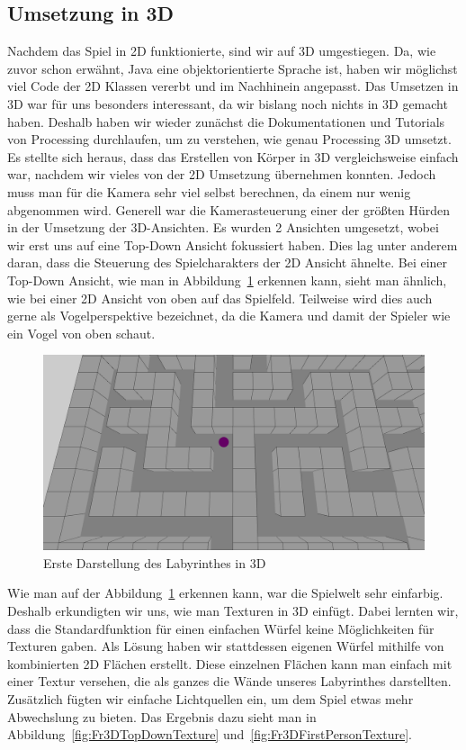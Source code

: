 \subsection{Umsetzung in 3D}\label{subsec:umsetzung-in-3D}
Nachdem das Spiel in 2D funktionierte, sind wir auf 3D umgestiegen. Da, wie zuvor schon erwähnt, Java eine objektorientierte Sprache ist, haben wir möglichst viel Code der 2D Klassen vererbt und im Nachhinein angepasst.
Das Umsetzen in 3D war für uns besonders interessant, da wir bislang noch nichts in 3D gemacht haben. Deshalb haben wir wieder zunächst die Dokumentationen und Tutorials von Processing durchlaufen, um zu verstehen, wie genau Processing 3D umsetzt. Es stellte sich heraus, dass das Erstellen von Körper in 3D vergleichsweise einfach war, nachdem wir vieles von der 2D Umsetzung übernehmen konnten. Jedoch muss man für die Kamera sehr viel selbst berechnen, da einem nur wenig abgenommen wird. Generell war die Kamerasteuerung einer der größten Hürden in der Umsetzung der 3D-Ansichten.
Es wurden 2 Ansichten umgesetzt, wobei wir erst uns auf eine Top-Down Ansicht fokussiert haben. Dies lag unter anderem daran, dass die Steuerung des Spielcharakters der 2D Ansicht ähnelte. Bei einer Top-Down Ansicht, wie man in Abbildung~\ref{fig:Fr3DTopDown} erkennen kann, sieht man ähnlich, wie bei einer 2D Ansicht von oben auf das Spielfeld. Teilweise wird dies auch gerne als Vogelperspektive bezeichnet, da die Kamera und damit der Spieler wie ein Vogel von oben schaut.

\begin{figure}[hbtp!]
    \centering
    \includegraphics[width=\paperwidth-3in]{../assets/img/Fr3DTopDown.PNG}
    \caption{Erste Darstellung des Labyrinthes in 3D}
    \label{fig:Fr3DTopDown}
\end{figure}

Wie man auf der Abbildung~\ref{fig:Fr3DTopDown} erkennen kann, war die Spielwelt sehr einfarbig. Deshalb erkundigten wir uns, wie man Texturen in 3D einfügt. Dabei lernten wir, dass die Standardfunktion für einen einfachen Würfel keine Möglichkeiten für Texturen gaben. Als Lösung haben wir stattdessen eigenen Würfel mithilfe von kombinierten 2D Flächen erstellt. Diese einzelnen Flächen kann man einfach mit einer Textur versehen, die als ganzes die Wände unseres Labyrinthes darstellten. Zusätzlich fügten wir einfache Lichtquellen ein, um dem Spiel etwas mehr Abwechslung zu bieten. Das Ergebnis dazu sieht man in Abbildung~\ref{fig:Fr3DTopDownTexture} und~\ref{fig:Fr3DFirstPersonTexture}.

